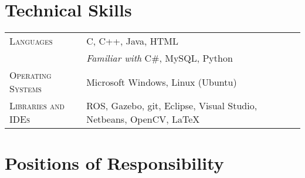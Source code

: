\documentclass[a4paper,10pt]{extarticle} %
\begin{document}
\section{Technical Skills}

\begin{tabular}{R{3.0cm}|p{15.0cm}}
\textsc{Languages} & C, C++, Java, HTML\\
& {\itshape{Familiar with}} C\#, MySQL, Python\\
\textsc{Operating Systems} &  Microsoft Windows, Linux (Ubuntu)\\
\textsc{Libraries and IDEs} & ROS, Gazebo, git, Eclipse, Visual Studio, Netbeans, OpenCV, \LaTeX\\
\end{tabular}


\section{Positions of Responsibility}
\end{document}
